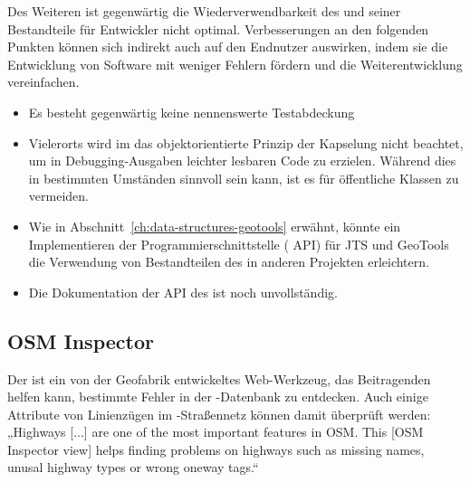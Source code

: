 \documentclass[../main/thesis.tex]{subfiles}
\begin{document}
Des Weiteren ist gegenwärtig die Wiederverwendbarkeit des  und seiner Bestandteile für Entwickler nicht optimal.
Verbesserungen an den folgenden Punkten können sich indirekt auch auf den Endnutzer auswirken, indem sie die Entwicklung von Software mit weniger Fehlern fördern und die Weiterentwicklung vereinfachen.
%
\begin{itemize}

\item
Es besteht gegenwärtig keine nennenswerte Testabdeckung 

\item
Vielerorts wird im  das objektorientierte Prinzip der Kapselung nicht beachtet, um in Debugging-Ausgaben leichter lesbaren Code zu erzielen.
Während dies in bestimmten Umständen sinnvoll sein kann, ist es für öffentliche Klassen zu vermeiden. 

\item
Wie in Abschnitt~\ref{ch:data-structures-geotools} erwähnt, könnte ein Implementieren der Programmierschnittstelle ( API) für JTS und GeoTools die Verwendung von Bestandteilen des  in anderen Projekten erleichtern.

\item
Die Dokumentation der API des  ist noch unvollständig.

\end{itemize}




\subsection{OSM Inspector}

Der  ist ein von der Geofabrik entwickeltes Web-Werkzeug, das Beitragenden helfen kann, bestimmte Fehler in der \osm-Datenbank zu entdecken.
Auch einige Attribute von Linienzügen im \osm-Straßennetz können damit überprüft werden:
„Highways [...] are one of the most important features in OSM.
This [OSM Inspector view] helps finding problems on highways such as missing names, unusal highway types or wrong oneway tags.“
\end{document}

